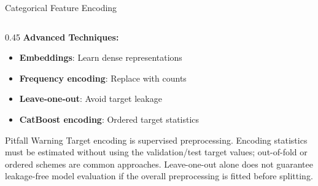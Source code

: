 \documentclass[aspectratio=169,11pt]{beamer}
\begin{document}
\begin{frame}[fragile]{Categorical Feature Encoding}
\begin{columns}
\begin{column}{0.45\textwidth}
\vspace{0.3cm}
\textbf{Advanced Techniques:}
\begin{itemize}
\item \textbf{Embeddings}: Learn dense representations
\item \textbf{Frequency encoding}: Replace with counts
\item \textbf{Leave-one-out}: Avoid target leakage
\item \textbf{CatBoost encoding}: Ordered target statistics
\end{itemize}

\begin{alertblock}{Pitfall Warning}
Target encoding is supervised preprocessing. Encoding statistics must be estimated without using the validation/test target values; out-of-fold or ordered schemes are common approaches. Leave-one-out alone does not guarantee leakage-free model evaluation if the overall preprocessing is fitted before splitting.
\end{alertblock}
\end{column}
\end{columns}
\end{frame}
\end{document}
